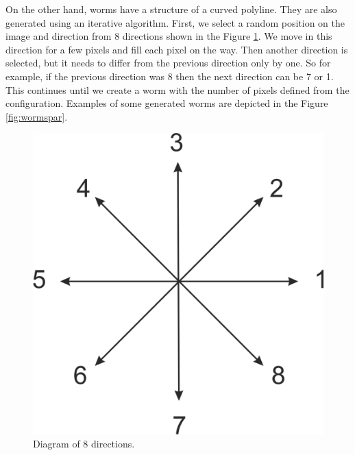 On the other hand, worms have a structure of a curved polyline. They are also generated using an iterative algorithm. First, we select a random position on the image and direction from 8 directions shown in the Figure \ref{img:8directions}. We move in this direction for a few pixels and fill each pixel on the way. Then another direction is selected, but it needs to differ from the previous direction only by one. So for example, if the previous direction was 8 then the next direction can be 7 or 1. This continues until we create a worm with the number of pixels defined from the configuration. Examples of some generated worms are depicted in the Figure \ref{fig:wormspar}. 

\begin{figure}[h]
    \centering
    \includegraphics[width=.23\textwidth]{images/8directions.png}
    \caption{Diagram of 8 directions.}
    \label{img:8directions}
\end{figure}

